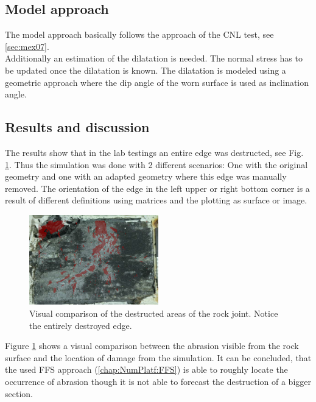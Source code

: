 \subsection{Model approach}
The model approach basically follows the approach of the CNL test, see \ref{sec:mex07}.\\
Additionally an estimation of the dilatation is needed. The normal stress has to be updated once the dilatation is known. The dilatation is modeled using a geometric approach where the dip angle of the worn surface is used as inclination angle.

\subsection{Results and discussion}
The results show that in the lab testings an entire edge was destructed, see Fig. \ref{fig:MEX3-2_AbrasionPic}. Thus the simulation was done with 2 different scenarios: One with the original geometry and one with an adapted geometry where this edge was manually removed. The orientation of the edge in the left upper or right bottom corner is a result of different definitions using matrices and the plotting as surface or image.\\
\begin{figure}[!ht]
\begin{center}
\includegraphics[width=0.5\textwidth]{./figures/MEX3-2_AbrasionPicVsSim.PNG}
\end{center}
\caption{Visual comparison of the destructed areas of the rock joint. Notice the entirely destroyed edge.}
\label{fig:MEX3-2_AbrasionPic}
\end{figure}


Figure \ref{fig:MEX3-2_AbrasionPic} shows a visual comparison between the abrasion visible from the rock surface and the location of damage from the simulation. It can be concluded, that the used FFS approach (\ref{chap:NumPlatf:FFS}) is able to roughly locate the occurrence of abrasion though it is not able to forecast the destruction of a bigger section.\\

